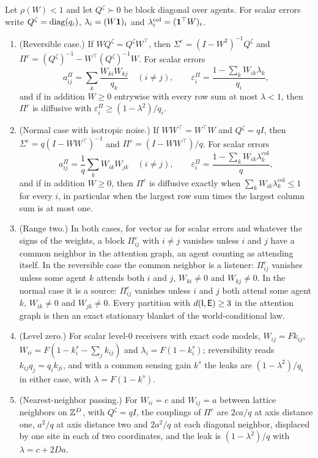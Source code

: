 \begin{theorem}\label{thm:col-diffusive-precision}
Let $\rho(W)<1$ and let $Q^{\zeta}\succ0$ be block diagonal over agents. For scalar errors write $Q^{\zeta}=\operatorname{diag}(q_i)$, $\lambda_i=(W\mathbf{1})_i$ and $\lambda^{\mathrm{col}}_i=(\mathbf{1}^\top W)_i$.
\begin{enumerate}
\item[(a)] (Reversible case.) If $WQ^{\zeta}=Q^{\zeta}W^\top$, then $\Sigma^c=(I-W^2)^{-1}Q^{\zeta}$ and $\Pi^c=(Q^{\zeta})^{-1}-W^\top(Q^{\zeta})^{-1}W$. For scalar errors
\begin{equation}\label{eq:col-pi-rev}
a^\Pi_{ij}=\sum_k\frac{W_{ki}W_{kj}}{q_k}\quad(i\neq j),\qquad\varepsilon^\Pi_i=\frac{1-\sum_kW_{ik}\lambda_k}{q_i},
\end{equation}
and if in addition $W\ge0$ entrywise with every row sum at most $\lambda<1$, then $\Pi^c$ is diffusive with $\varepsilon^\Pi_i\ge(1-\lambda^2)/q_i$.
\item[(b)] (Normal case with isotropic noise.) If $WW^\top=W^\top W$ and $Q^{\zeta}=qI$, then $\Sigma^c=q(I-WW^\top)^{-1}$ and $\Pi^c=(I-WW^\top)/q$. For scalar errors
\begin{equation}\label{eq:col-pi-normal}
a^\Pi_{ij}=\frac1q\sum_kW_{ik}W_{jk}\quad(i\neq j),\qquad\varepsilon^\Pi_i=\frac{1-\sum_kW_{ik}\lambda^{\mathrm{col}}_k}{q},
\end{equation}
and if in addition $W\ge0$, then $\Pi^c$ is diffusive exactly when $\sum_kW_{ik}\lambda^{\mathrm{col}}_k\le1$ for every $i$, in particular when the largest row sum times the largest column sum is at most one.
\item[(c)] (Range two.) In both cases, for vector as for scalar errors and whatever the signs of the weights, a block $\Pi^c_{ij}$ with $i\neq j$ vanishes unless $i$ and $j$ have a common neighbor in the attention graph, an agent counting as attending itself. In the reversible case the common neighbor is a listener: $\Pi^c_{ij}$ vanishes unless some agent $k$ attends both $i$ and $j$, $W_{ki}\neq0$ and $W_{kj}\neq0$. In the normal case it is a source: $\Pi^c_{ij}$ vanishes unless $i$ and $j$ both attend some agent $k$, $W_{ik}\neq0$ and $W_{jk}\neq0$. Every partition with $d(\mathsf{I},\mathsf{E})\ge3$ in the attention graph is then an exact stationary blanket of the world-conditional law.
\item[(d)] (Level zero.) For scalar level-0 receivers with exact code models, $W_{ij}=Fk_{ij}$, $W_{ii}=F(1-k^s_i-\sum_jk_{ij})$ and $\lambda_i=F(1-k^s_i)$; reversibility reads $k_{ij}q_j=q_ik_{ji}$, and with a common sensing gain $k^s$ the leaks are $(1-\lambda^2)/q_i$ in either case, with $\lambda=F(1-k^s)$.
\item[(e)] (Nearest-neighbor passing.) For $W_{ii}=c$ and $W_{ij}=a$ between lattice neighbors on $\mathbb{Z}^D$, with $Q^{\zeta}=qI$, the couplings of $\Pi^c$ are $2ca/q$ at axis distance one, $a^2/q$ at axis distance two and $2a^2/q$ at each diagonal neighbor, displaced by one site in each of two coordinates, and the leak is $(1-\lambda^2)/q$ with $\lambda=c+2Da$.
\end{enumerate}
\end{theorem}
